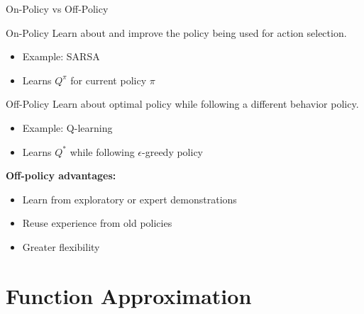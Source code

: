 \documentclass[aspectratio=169]{beamer}
\begin{document}
\begin{frame}{On-Policy vs Off-Policy}
  \begin{definitionbox}{On-Policy}
    Learn about and improve the policy being used for action selection.
    \begin{itemize}
      \item Example: SARSA
      \item Learns $Q^\pi$ for current policy $\pi$
    \end{itemize}
  \end{definitionbox}

  \vspace{0.5em}

  \begin{definitionbox}{Off-Policy}
    Learn about optimal policy while following a different behavior policy.
    \begin{itemize}
      \item Example: Q-learning
      \item Learns $Q^*$ while following $\epsilon$-greedy policy
    \end{itemize}
  \end{definitionbox}

  \vspace{0.5em}

  \textbf{Off-policy advantages:}
  \begin{itemize}
    \item Learn from exploratory or expert demonstrations
    \item Reuse experience from old policies
    \item Greater flexibility
  \end{itemize}
\end{frame}

\section{Function Approximation}
\end{document}
